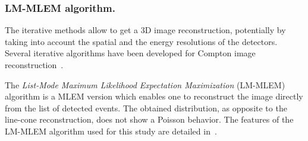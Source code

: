 \subsubsection{LM-MLEM algorithm.}	
The iterative methods allow to get a 3D image reconstruction, potentially by taking into account the spatial and the energy resolutions of the detectors. Several iterative algorithms have been developed for Compton image reconstruction~\cite{Wilderman1998, schone_common_2010, Andreyev2011, zoglauer_design_2011,gillam_compton_2011,mackin_evaluation_2012, lojacono_low_2013, Taya2017, Schoene2017, Huang2018}.

The \textit{List-Mode Maximum Likelihood Expectation Maximization} (LM-MLEM) algorithm is a MLEM version which enables one to reconstruct the image directly from the list of detected events. The obtained distribution, as opposite to the line-cone reconstruction, does not show a Poisson behavior. 
The features of the LM-MLEM algorithm used for this study are detailed in~\cite{hilaire_compton_2014}. 

